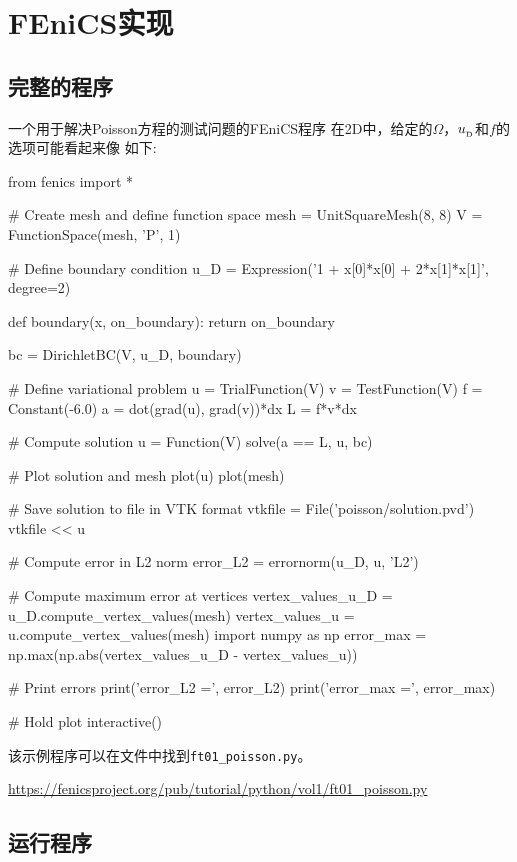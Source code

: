 \section{FEniCS实现}
\label{ch:poisson0:impl}

\subsection{完整的程序}
一个用于解决Poisson方程的测试问题的FEniCS程序
在2D中，给定的$\Omega$，$\ub$和$f$的选项可能看起来像
如下:

\begin{bash}
from fenics import *

# Create mesh and define function space
mesh = UnitSquareMesh(8, 8)
V = FunctionSpace(mesh, 'P', 1)

# Define boundary condition
u_D = Expression('1 + x[0]*x[0] + 2*x[1]*x[1]', degree=2)

def boundary(x, on_boundary):
    return on_boundary

bc = DirichletBC(V, u_D, boundary)

# Define variational problem
u = TrialFunction(V)
v = TestFunction(V)
f = Constant(-6.0)
a = dot(grad(u), grad(v))*dx
L = f*v*dx

# Compute solution
u = Function(V)
solve(a == L, u, bc)

# Plot solution and mesh
plot(u)
plot(mesh)

# Save solution to file in VTK format
vtkfile = File('poisson/solution.pvd')
vtkfile << u

# Compute error in L2 norm
error_L2 = errornorm(u_D, u, 'L2')

# Compute maximum error at vertices
vertex_values_u_D = u_D.compute_vertex_values(mesh)
vertex_values_u = u.compute_vertex_values(mesh)
import numpy as np
error_max = np.max(np.abs(vertex_values_u_D - vertex_values_u))

# Print errors
print('error_L2  =', error_L2)
print('error_max =', error_max)

# Hold plot
interactive()
\end{bash}

该示例程序可以在文件中找到{\nolinkurl{ft01_poisson.py}}。
\begin{center}
  \url{https://fenicsproject.org/pub/tutorial/python/vol1/ft01_poisson.py}
\end{center}


\subsection{运行程序}
\label{ch:poisson0:impl:run}

